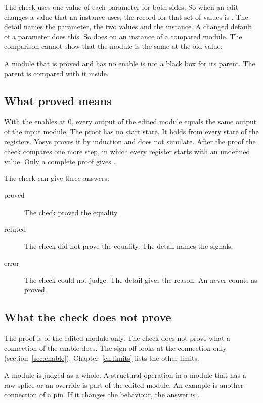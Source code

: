 The check uses one value of each parameter for both sides. So when an edit changes a value
that an instance uses, the record for that set of values is . The detail names
the parameter, the two values and the instance. A changed default of a parameter does this.
So does  on an instance of a compared module. The comparison
cannot show that the module is the same at the old value.

A module that is proved and has no enable is not a black box for its parent. The parent is
compared with it inside.

\subsection*{What proved means}

With the enables at 0, every output of the edited module equals the same output of the
input module. The proof has no start state. It holds from every state of the registers.
Yosys proves it by induction and does not simulate. After the proof the check compares one
more step, in which every register starts with an undefined value. Only a complete proof
gives .

The check can give three answers:

\begin{description}
\item[proved] The check proved the equality.
\item[refuted] The check did not prove the equality. The detail names the signals.
\item[error] The check could not judge. The detail gives the reason. An  never
  counts as proved.
\end{description}

\subsection*{What the check does not prove}

The proof is of the edited module only. The check does not prove what a connection of the
enable does. The sign-off looks at the connection only (section~\ref{sec:enable}).
Chapter~\ref{ch:limits} lists the other limits.

A module is judged as a whole. A structural operation in a module that has a raw splice
or an override is part of the edited module. An example is another connection of a pin. If
it changes the behaviour, the answer is .


